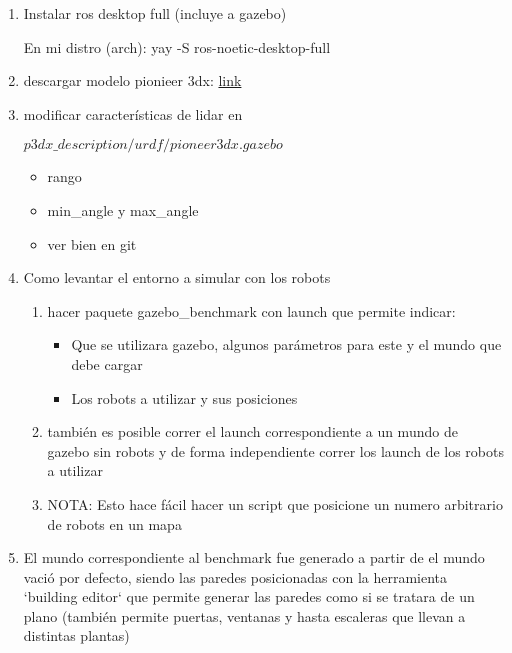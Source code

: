 \begin{enumerate}
  \item Instalar ros desktop full (incluye a gazebo)
    
     En mi distro (arch): yay -S ros-noetic-desktop-full

  \item descargar modelo pionieer 3dx: \href{https://github.com/mario-serna/pioneer_p3dx_model}{link}
  \item modificar características de lidar en

        $p3dx\_description/urdf/pioneer3dx.gazebo$
  \begin{itemize}
       \item rango  
       \item min\_angle y max\_angle  
       \item ver bien en git 
  \end{itemize}
  \item Como levantar el entorno a simular con los robots
  \begin{enumerate}
    \item hacer paquete gazebo\_benchmark con launch que permite indicar:
    \begin{itemize}
       \item Que se utilizara gazebo, algunos parámetros para este y el mundo que debe cargar
       \item Los robots a utilizar y sus posiciones
    \end{itemize}
    \item también es posible correr el launch correspondiente a un mundo de gazebo sin robots y de forma independiente correr los launch de los robots a utilizar
    \item NOTA: Esto hace fácil hacer un script que posicione un numero arbitrario de robots en un mapa
  \end{enumerate}
  \item El mundo correspondiente al benchmark fue generado a partir de el mundo vació por defecto, siendo las paredes posicionadas con la herramienta `building editor` que permite generar las paredes como si se tratara de un plano (también permite puertas, ventanas y hasta escaleras que llevan a distintas plantas)
\end{enumerate}


